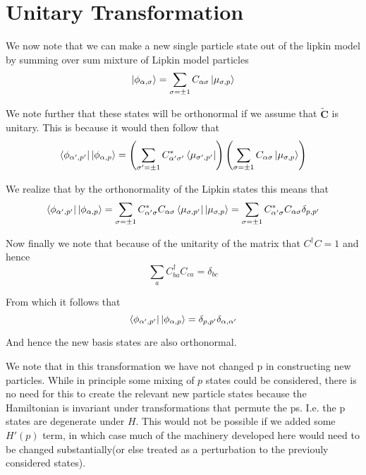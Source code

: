 \documentclass[11pt]{article} %
\begin{document}
\section{Unitary Transformation}

We now note that we can make a new single particle state out of the lipkin model by summing over sum mixture of Lipkin model particles\\

\begin{equation} \ket{\phi_{\alpha,\sigma}}=\sum_{\sigma=\pm 1} C_{\alpha \sigma} \ket{\mu_{\sigma,p}}\end{equation}

We note further that these states will be orthonormal if we assume that $\mathbf{\tilde{C}}$ is unitary. This is because it would then follow that\\

\begin{equation}
\bra{\phi_{\alpha',p'}}\ket{\phi_{\alpha,p}}=\left(\sum_{\sigma'=\pm 1} C_{\alpha' \sigma'}^*\bra{\mu_{\sigma',p'}}\right)\left(\sum_{\sigma=\pm 1} C_{\alpha \sigma}\ket{\mu_{\sigma,p}}\right)\end{equation}

We realize that by the orthonormality of the Lipkin states this means that\\
\begin{equation}
\bra{\phi_{\alpha',p'}}\ket{\phi_{\alpha,p}}= \sum_{\sigma=\pm 1} C_{\alpha' \sigma}^* C_{\alpha \sigma} \bra{\mu_{\sigma,p'}} \ket{\mu_{\sigma,p}}=\sum_{\sigma=\pm 1} C_{\alpha' \sigma}^* C_{\alpha \sigma} \delta_{p,p'}\end{equation}


Now finally we note that because of the unitarity of the matrix that $C^\dagger C=1$ and hence \\
\begin{equation} \sum_a C_{ b a}^\dagger C_{c a}=\delta_{bc} \end{equation}

From which it follows that
\begin{equation}
\bra{\phi_{\alpha',p'}}\ket{\phi_{\alpha,p}}=\delta_{p,p'}\delta_{\alpha,\alpha'}\end{equation}

And hence the new basis states are also orthonormal. 

We note that in this transformation we have not changed p in constructing new particles. While in principle some mixing of $p$ states could be considered, there is no need for this to create the relevant new particle states because the Hamiltonian is invariant under transformations that permute the ps. I.e. the p states are degenerate under $H$. This would not be possible if we added some $H'(p)$ term, in which case much of the machinery developed here would need to be changed substantially(or else treated as a perturbation to the previouly considered states).\\
\end{document}
